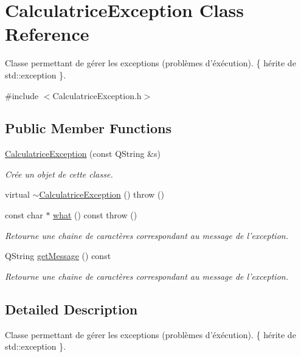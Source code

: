 \hypertarget{classCalculatriceException}{\section{\-Calculatrice\-Exception \-Class \-Reference}
\label{classCalculatriceException}
}


\-Classe permettant de gérer les exceptions (problèmes d'éxécution). \{ hérite de std\-::exception \}.  




{\ttfamily \#include $<$\-Calculatrice\-Exception.\-h$>$}

\subsection*{\-Public \-Member \-Functions}
\begin{DoxyCompactItemize}
\item 
\hyperlink{classCalculatriceException_a8a8ae0692ff39f8024ce25db9fecb19c}{\-Calculatrice\-Exception} (const \-Q\-String \&s)
\begin{DoxyCompactList}\small\item\em \-Crée un objet de cette classe. \end{DoxyCompactList}\item 
virtual \hyperlink{classCalculatriceException_ae361d42068f809808f9225369adb8d5d}{$\sim$\-Calculatrice\-Exception} ()  throw ()
\item 
const char $\ast$ \hyperlink{classCalculatriceException_a4c5cb709fec6dbbd0a059544937440c4}{what} () const   throw ()
\begin{DoxyCompactList}\small\item\em \-Retourne une chaine de caractères correspondant au message de l'exception. \end{DoxyCompactList}\item 
\-Q\-String \hyperlink{classCalculatriceException_a3f579c548ccd49c458a66b0197be3210}{get\-Message} () const 
\begin{DoxyCompactList}\small\item\em \-Retourne une chaine de caractères correspondant au message de l'exception. \end{DoxyCompactList}\end{DoxyCompactItemize}


\subsection{\-Detailed \-Description}
\-Classe permettant de gérer les exceptions (problèmes d'éxécution). \{ hérite de std\-::exception \}. 

